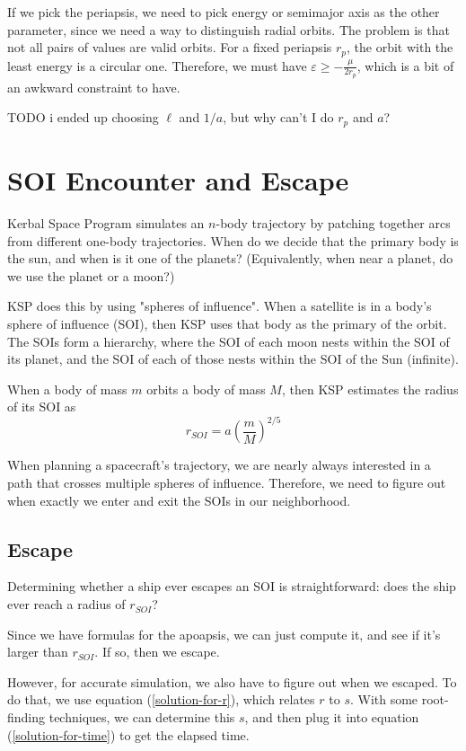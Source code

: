 \documentclass{article}
\numberwithin{equation}{subsection}
\begin{document}
If we pick the periapsis, we need to pick energy or semimajor axis as the other parameter, since we need a way to distinguish radial orbits. The problem is that not all pairs of values are valid orbits. For a fixed periapsis $r_p$, the orbit with the least energy is a circular one. Therefore, we must have $\varepsilon \ge -\frac{\mu}{2r_p}$, which is a bit of an awkward constraint to have.

TODO i ended up choosing $\ell$ and $1/a$, but why can't I do $r_p$ and $a$?


\section{SOI Encounter and Escape}

Kerbal Space Program simulates an $n$-body trajectory by patching together arcs from different one-body trajectories. When do we decide that the primary body is the sun, and when is it one of the planets? (Equivalently, when near a planet, do we use the planet or a moon?)

KSP does this by using "spheres of influence". When a satellite is in a body's sphere of influence (SOI), then KSP uses that body as the primary of the orbit. The SOIs form a hierarchy, where the SOI of each moon nests within the SOI of its planet, and the SOI of each of those nests within the SOI of the Sun (infinite).

When a body of mass $m$ orbits a body of mass $M$, then KSP estimates the radius of its SOI as
\begin{equation}
r_{SOI} = a \left( \frac{m}{M} \right)^{2/5}
\end{equation}

When planning a spacecraft's trajectory, we are nearly always interested in a path that crosses multiple spheres of influence. Therefore, we need to figure out when exactly we enter and exit the SOIs in our neighborhood.

\subsection{Escape}

Determining whether a ship ever escapes an SOI is straightforward: does the ship ever reach a radius of $r_{SOI}$?

Since we have formulas for the apoapsis, we can just compute it, and see if it's larger than $r_{SOI}$. If so, then we escape.

However, for accurate simulation, we also have to figure out when we escaped. To do that, we use equation (\ref{solution-for-r}), which relates $r$ to $s$. With some root-finding techniques, we can determine this $s$, and then plug it into equation (\ref{solution-for-time}) to get the elapsed time.
\end{document}

